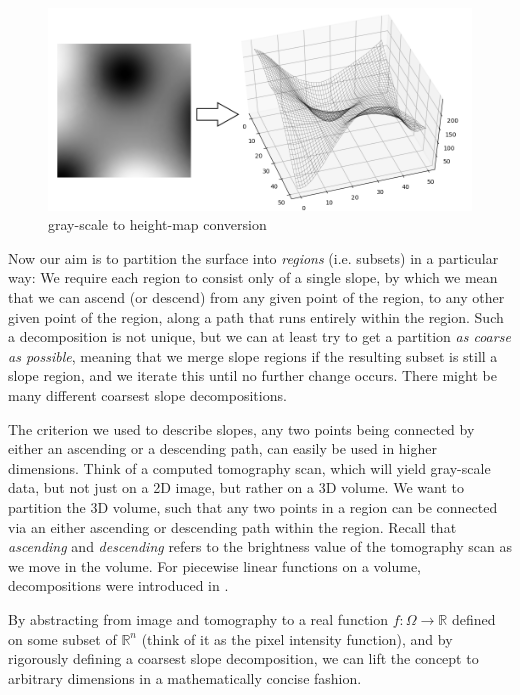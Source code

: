 \documentclass[11pt,twoside,twocolumn,a4paper]{article}
\theoremstyle{plain}
\theoremstyle{definition}
\begin{document}
\begin{figure}
\centering
\includegraphics[width=\columnwidth]{img/visu1.png}
\caption{gray-scale to height-map conversion}
\label{fig:conversion}
\end{figure}

Now our aim is to partition the surface into \emph{regions} (i.e. subsets) in a particular way:
We require each region to consist only of a single slope, by which we mean that we can ascend (or descend) from any given point of the region, to any other given point of the region, along a path that runs entirely within the region.
Such a decomposition is not unique, but we can at least try to get a partition \emph{as coarse as possible}, meaning that we merge slope regions if the resulting subset is still a slope region, and we iterate this until no further change occurs.
There might be many different coarsest slope decompositions.

The criterion we used to describe slopes, any two points being connected by either an ascending or a descending path, can easily be used in higher dimensions.
Think of a computed tomography scan, which will yield gray-scale data, but not just on a 2D image, but rather on a 3D volume.
We want to partition the 3D volume, such that any two points in a region can be connected via an either ascending or descending path within the region.
Recall that \emph{ascending} and \emph{descending} refers to the brightness value of the tomography scan as we move in the volume. For piecewise linear functions on a volume, decompositions were introduced in \cite{edelsbrunner2003morse}. 

By abstracting from image and tomography to a real function $f: \Omega \rightarrow \mathbb{R}$ defined on some subset of $\mathbb{R}^n$ (think of it as the pixel intensity function), and by rigorously defining a coarsest slope decomposition, we can lift the concept to arbitrary dimensions in a mathematically concise fashion.
\end{document}
